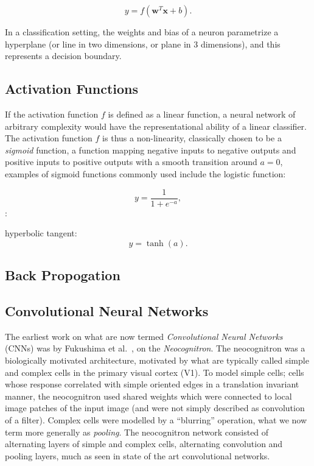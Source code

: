 \documentclass[thesis]{subfiles}
\begin{document}
\begin{equation}
y = f(\mathbf{w}^T\mathbf{x} + b).
\end{equation}

In a classification setting, the weights and bias of a neuron parametrize a hyperplane (or line in two dimensions, or plane in 3 dimensions), and this represents a decision boundary.

\subsection{Activation Functions}
If the activation function $f$ is defined as a linear function, a neural network of arbitrary complexity would have the representational ability of a linear classifier. The activation function $f$ is thus a non-linearity, classically chosen to be a \emph{sigmoid} function, \ie a function mapping negative inputs to negative outputs and positive inputs to positive outputs with a smooth transition around $a = 0$, examples of sigmoid functions commonly used include the logistic function: 

\begin{equation}
	y = \frac{1}{1+e^{-a}},
\end{equation}:

hyperbolic tangent:
\begin{equation}
	y = \tanh(a).
\end{equation}

\subsection{Back Propogation}

\subsection{Convolutional Neural Networks}
The earliest work on what are now termed \emph{Convolutional Neural Networks} (CNNs) was by Fukushima et al.~\cite{Fuk80,fukushima2013artificial}, on the \emph{Neocognitron}. The neocognitron was a biologically motivated architecture, motivated by what are typically called simple and complex cells in the primary visual cortex (V1). To model simple cells; cells whose response correlated with simple oriented edges in a translation invariant manner, the neocognitron used shared weights which were connected to local image patches of the input image (and were not simply described as convolution of a filter). Complex cells were modelled by a ``blurring'' operation, what we now term more generally as \emph{pooling}. The neocognitron network consisted of alternating layers of simple and complex cells, \ie alternating convolution and pooling layers, much as seen in state of the art convolutional networks.
\end{document}

